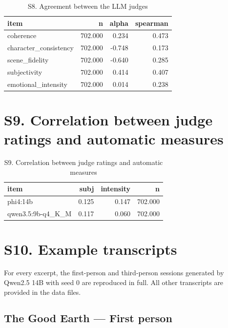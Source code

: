 \documentclass[10pt]{article}
\begin{document}
{\scriptsize
\begin{longtable}{lrrr}
\caption{S8. Agreement between the LLM judges}\\
\toprule
item & n & alpha & spearman \\
\midrule
\endhead
coherence & 702.000 & 0.234 & 0.473 \\
character\_consistency & 702.000 & -0.748 & 0.173 \\
scene\_fidelity & 702.000 & -0.640 & 0.285 \\
subjectivity & 702.000 & 0.414 & 0.407 \\
emotional\_intensity & 702.000 & 0.014 & 0.238 \\
\bottomrule
\end{longtable}
}


\section*{S9. Correlation between judge ratings and automatic measures}

{\scriptsize
\begin{longtable}{lrrr}
\caption{S9. Correlation between judge ratings and automatic measures}\\
\toprule
item & subj & intensity & n \\
\midrule
\endhead
phi4:14b & 0.125 & 0.147 & 702.000 \\
qwen3.5:9b-q4\_K\_M & 0.117 & 0.060 & 702.000 \\
\bottomrule
\end{longtable}
}


\section*{S10. Example transcripts}

For every excerpt, the first-person and third-person sessions generated by Qwen2.5 14B with seed 0 are reproduced in full. All other transcripts are provided in the data files.

\subsection*{The Good Earth --- First person}
\end{document}
